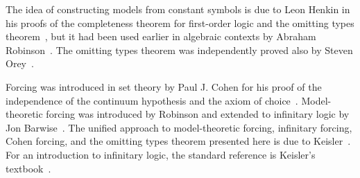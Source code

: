 \documentclass{scrartcl}
\begin{document}
\begin{history}
The idea of constructing models from constant symbols is due to Leon Henkin in his proofs of the completeness theorem for first-order logic and the omitting types theorem~\cite{Henkin:1949,Henkin:1950,Henkin:1954}, but it had been used earlier in algebraic contexts by Abraham Robinson~\cite{Robinson:1951}. The omitting types theorem was independently proved also by Steven Orey~\cite{Orey:1956}.

Forcing was introduced in set theory by Paul J. Cohen for his proof of the independence of the continuum hypothesis and the axiom of choice~\cite{Cohen:1963}.
Model-theoretic forcing was introduced by Robinson and extended to infinitary logic by Jon Barwise~\cite{Robinson:1970,Robinson:1971,Barwise-Robinson:1970}. 
The unified approach to model-theoretic forcing, infinitary forcing, Cohen forcing, and the omitting types theorem presented here is due to Keisler~\cite{Keisler:1973}.
For an introduction to infinitary logic, the standard reference is Keisler's textbook~\cite{Keisler:1971}.

\end{history}
\end{document}
